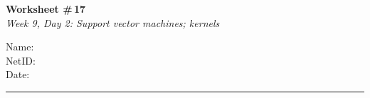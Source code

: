 \documentclass[11pt]{article}
\begin{document}
\noindent
\begin{minipage}[t]{0.55\textwidth}
  \vspace{0pt}
  {\LARGE \textbf{Worksheet \#\,17}} \\[0.3em]
  {\large \textit{Week 9, Day 2: Support vector machines; kernels}}
\end{minipage}
\hfill
\begin{minipage}[t]{0.40\textwidth}
  \vspace{0pt}
  \begin{mdframed}[linecolor=black, linewidth=1pt, innertopmargin=10pt, innerbottommargin=10pt]
    \small
    \vspace{0.4cm}
    Name: \underline{\hspace{4.5cm}} \\[1em]
    NetID: \underline{\hspace{4.3cm}} \\[1em]
    Date: \underline{\hspace{4.4cm}} \\
  \end{mdframed}
\end{minipage}

\vspace{1em}
\noindent\rule{\linewidth}{1pt}
\vspace{0.2em}
\end{document}

